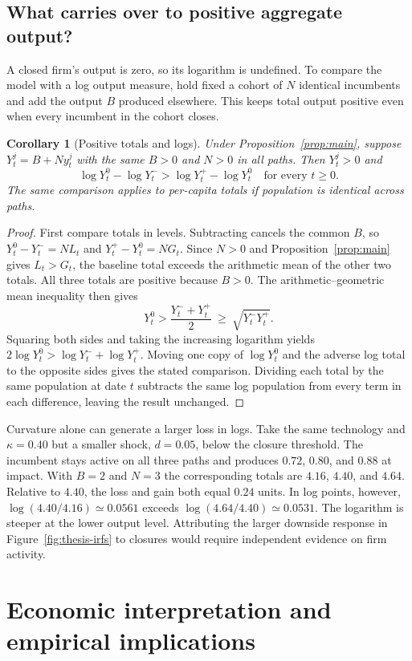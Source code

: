 \documentclass[11pt,letterpaper]{article}
\newtheorem{corollary}{Corollary}
\begin{document}
\subsection*{What carries over to positive aggregate output?}
A closed firm's output is zero, so its logarithm is undefined. To compare the model with a log output measure, hold fixed a cohort of $N$ identical incumbents and add the output $B$ produced elsewhere. This keeps total output positive even when every incumbent in the cohort closes.

\begin{corollary}[Positive totals and logs]\label{cor:logs}
Under Proposition~\ref{prop:main}, suppose $Y_t^j=B+Ny_t^j$ with the same $B>0$ and $N>0$ in all paths. Then $Y_t^j>0$ and
\[
\log Y_t^0-\log Y_t^->\log Y_t^+-\log Y_t^0
\quad\text{for every }t\geq0.
\]
The same comparison applies to per-capita totals if population is identical across paths.
\end{corollary}
\begin{proof}
First compare totals in levels. Subtracting cancels the common $B$, so $Y_t^0-Y_t^-=NL_t$ and $Y_t^+-Y_t^0=NG_t$. Since $N>0$ and Proposition~\ref{prop:main} gives $L_t>G_t$, the baseline total exceeds the arithmetic mean of the other two totals. All three totals are positive because $B>0$. The arithmetic--geometric mean inequality then gives
\[
 Y_t^0>\frac{Y_t^-+Y_t^+}{2}\ \geq\ \sqrt{Y_t^-Y_t^+}.
\]
Squaring both sides and taking the increasing logarithm yields $2\log Y_t^0>\log Y_t^-+\log Y_t^+$. Moving one copy of $\log Y_t^0$ and the adverse log total to the opposite sides gives the stated comparison. Dividing each total by the same population at date $t$ subtracts the same log population from every term in each difference, leaving the result unchanged.
\end{proof}
Curvature alone can generate a larger loss in logs. Take the same technology and $\kappa=0.40$ but a smaller shock, $d=0.05$, below the closure threshold. The incumbent stays active on all three paths and produces $0.72$, $0.80$, and $0.88$ at impact. With $B=2$ and $N=3$ the corresponding totals are $4.16$, $4.40$, and $4.64$. Relative to $4.40$, the loss and gain both equal $0.24$ units. In log points, however, $\log(4.40/4.16)\simeq0.0561$ exceeds $\log(4.64/4.40)\simeq0.0531$. The logarithm is steeper at the lower output level. Attributing the larger downside response in Figure~\ref{fig:thesis-irfs} to closures would require independent evidence on firm activity.

\section{Economic interpretation and empirical implications}
\end{document}
